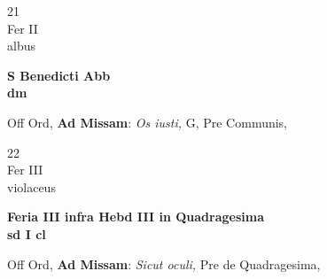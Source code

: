 \documentclass[10pt, openany]{book}
\begin{document}
        \begin{center}
            \begin{minipage}{3.5in}
                \vspace{2em}
                \begin{minipage}{0.5in}
                    {\Huge 21} \\
                    {\normalsize Fer II} \\
                    {\normalsize albus}
                \end{minipage}
                \begin{minipage}{3.0in}
                    \textbf{ \large S Benedicti Abb \\
                    \textnormal{\normalsize dm}} \\ 
                \end{minipage}
                \begin{justify}Off Ord, \textbf{Ad Missam}: \textit{Os iusti,} G, Pre Communis,  
                \end{justify}
            \end{minipage}
        \end{center}
    
        \begin{center}
            \begin{minipage}{3.5in}
                \vspace{2em}
                \begin{minipage}{0.5in}
                    {\Huge 22} \\
                    {\normalsize Fer III} \\
                    {\normalsize violaceus}
                \end{minipage}
                \begin{minipage}{3.0in}
                    \textbf{ \large Feria III infra Hebd III in Quadragesima \\
                    \textnormal{\normalsize sd I cl}} \\ 
                \end{minipage}
                \begin{justify}Off Ord, \textbf{Ad Missam}: \textit{Sicut oculi,} Pre de Quadragesima,  
                \end{justify}
            \end{minipage}
        \end{center}
    
\end{document}

